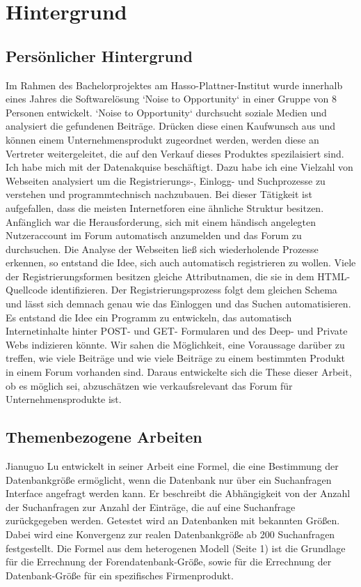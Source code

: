 \section{Hintergrund}

\subsection{Persönlicher Hintergrund}
Im Rahmen des Bachelorprojektes am Hasso-Plattner-Institut wurde innerhalb eines Jahres die Softwarelösung `Noise to Opportunity` in einer Gruppe von 8 Personen entwickelt. `Noise to Opportunity` durchsucht soziale Medien und analysiert die gefundenen Beiträge. Drücken diese einen Kaufwunsch aus und können einem Unternehmensprodukt zugeordnet werden, werden diese an Vertreter weitergeleitet, die auf den Verkauf dieses Produktes spezilaisiert sind. Ich habe mich mit der Datenakquise beschäftigt. Dazu habe ich eine Vielzahl von Webseiten analysiert um die Registrierungs-, Einlogg- und Suchprozesse zu verstehen und programmtechnisch nachzubauen. Bei dieser Tätigkeit ist aufgefallen, dass die meisten Internetforen eine ähnliche Struktur besitzen. Anfänglich war die Herausforderung, sich mit einem händisch angelegten Nutzeraccount im Forum automatisch anzumelden und das Forum zu durchsuchen. Die Analyse der Webseiten ließ sich wiederholende Prozesse erkennen, so entstand die Idee, sich auch automatisch registrieren zu wollen.
Viele der Registrierungsformen besitzen gleiche Attributnamen, die sie in dem HTML-Quellcode identifizieren. Der Registrierungsprozess folgt dem gleichen Schema und lässt sich demnach genau wie das Einloggen und das Suchen automatisieren. Es entstand die Idee ein Programm zu entwickeln, das automatisch Internetinhalte hinter POST- und GET- Formularen und des Deep- und Private Webs indizieren könnte. Wir sahen die Möglichkeit, eine Voraussage darüber zu treffen, wie viele Beiträge und wie viele Beiträge zu einem bestimmten Produkt in einem Forum vorhanden sind.
Daraus entwickelte sich die These dieser Arbeit, ob es möglich sei, abzuschätzen wie verkaufsrelevant das Forum für Unternehmensprodukte ist.

\subsection{Themenbezogene Arbeiten}

Jianuguo Lu \cite{lu2008efficient} entwickelt in seiner Arbeit eine Formel, die eine Bestimmung der Datenbankgröße ermöglicht, wenn die Datenbank nur über ein Suchanfragen Interface angefragt werden kann. Er beschreibt die Abhängigkeit von der Anzahl der Suchanfragen zur Anzahl der Einträge, die auf eine Suchanfrage zurückgegeben werden. Getestet wird an Datenbanken mit bekannten Größen. Dabei wird eine Konvergenz zur realen Datenbankgröße ab 200 Suchanfragen festgestellt. Die Formel aus dem heterogenen Modell (Seite 1) ist die Grundlage für die Errechnung der Forendatenbank-Größe, sowie für die Errechnung der Datenbank-Größe für ein spezifisches Firmenprodukt.

